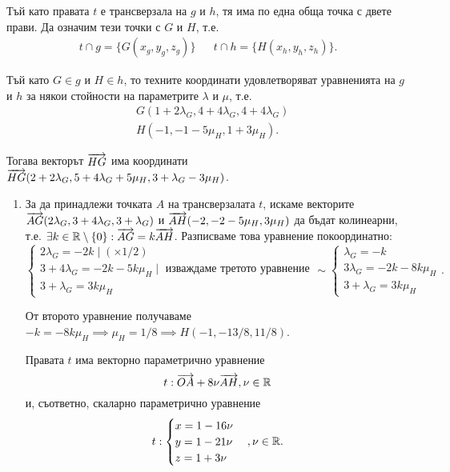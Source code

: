 \documentclass[numbers=endperiod, DIV=15, bibliography=totocnumbered]{scrartcl}
\begin{document}
\begin{solution}
  Тъй като правата $t$ е трансверзала на $g$ и $h$, тя има по една обща точка с двете прави. Да означим тези точки с $G$ и $H$, т.е.
  \begin{align*}
    t \cap g = \{ G(x_g, y_g, z_g) \}
    &&
    t \cap h = \{ H(x_h, y_h, z_h) \}.
  \end{align*}

  Тъй като $G \in g$ и $H \in h$, то техните координати удовлетворяват уравненията на $g$ и $h$ за някои стойности на параметрите $\lambda$ и $\mu$, т.е.
  \begin{align*}
    &G(1 + 2\lambda_G, 4 + 4\lambda_G, 4 + 4\lambda_G) \\
    &H(-1, -1 -5\mu_H, 1 + 3\mu_H).
  \end{align*}

  Тогава векторът $\overrightarrow{HG}$ има координати $\overrightarrow{HG}(2 + 2\lambda_G, 5 + 4\lambda_G + 5\mu_H, 3 + \lambda_G - 3\mu_H)$.

  \begin{enumerate}[label=\alph*)]
    \item За да принадлежи точката $A$ на трансверзалата $t$, искаме векторите $\overrightarrow{AG}(2\lambda_G, 3 + 4\lambda_G, 3 + \lambda_G)$ и $\overrightarrow{AH}(-2, -2 - 5\mu_H, 3\mu_H)$ да бъдат колинеарни, т.е. $\exists k \in \mathbb{R} \setminus \{ 0 \}: \overrightarrow{AG} = k\overrightarrow{AH}$. Разписваме това уравнение покоординатно:
    \begin{displaymath}
      \begin{cases}
        2\lambda_G = -2k \mid (\times 1 / 2) \\
        3 + 4\lambda_G = -2k - 5k\mu_H \mid \text{ изваждаме третото уравнение} \\
        3 + \lambda_G = 3k\mu_H
      \end{cases}
      \sim
      \begin{cases}
        \lambda_G = -k \\
        3\lambda_G = -2k - 8k\mu_H \\
        3 + \lambda_G = 3k\mu_H
      \end{cases}.
    \end{displaymath}

    От второто уравнение получаваме $-k = -8k\mu_H \implies \mu_H = 1 / 8 \implies H(-1, -13/8, 11/8)$.

    Правата $t$ има векторно параметрично уравнение
    \begin{displaymath}
      t: \overrightarrow{OA} + 8 \nu \overrightarrow{AH}, \nu \in \mathbb{R}
    \end{displaymath}
    и, съответно, скаларно параметрично уравнение
    \begin{displaymath}
      t: \begin{cases}
        x = 1 - 16\nu \\
        y = 1 - 21 \nu \\
        z = 1 + 3 \nu
      \end{cases},
      \nu \in \mathbb{R}.
    \end{displaymath}


\end{enumerate}
\end{solution}
\end{document}
